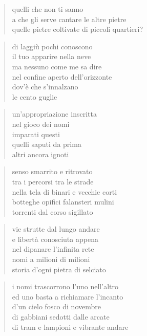 \begin{verse}
    quelli che non ti sanno\\
    a che gli serve cantare le altre pietre\\
    quelle pietre coltivate di piccoli quartieri?
\end{verse}

\begin{verse}
    di laggiù pochi conoscono\\
    il tuo apparire nella neve\\
    ma nessuno come me sa dire\\
    nel confine aperto dell'orizzonte\\
    dov'è che s'innalzano\\
    le cento guglie
\end{verse}

\clearpage


\begin{verse}
    un'appropriazione inscritta\\
    nel gioco dei nomi\\
    imparati questi\\
    quelli saputi da prima\\
    altri ancora ignoti
\end{verse}

\begin{verse}
    senso smarrito e ritrovato\\
    tra i percorsi tra le strade\\
    nella tela di binari e vecchie corti\\
    botteghe opifici falansteri mulini\\
    torrenti dal corso sigillato
\end{verse}

\begin{verse}
    vie strutte dal lungo andare\\
    e libertà conosciuta appena\\
    nel dipanare l'infinita rete\\
    nomi a milioni di milioni\\
    storia d'ogni pietra di selciato
\end{verse}

\begin{verse}
    i nomi trascorrono l'uno nell'altro\\
    ed uno basta a richiamare l'incanto\\
    d'un cielo fosco di novembre\\
    di gabbiani sedotti dalle arcate\\
    di tram e lampioni e vibrante andare
\end{verse}

